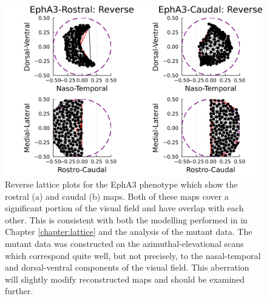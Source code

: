 \begin{figure}[hbt!]
	\centering
	\includegraphics[width=\textwidth]{images/distributed_kernels/figure_lattice_EphA3_post}
	\def\c{Reverse lattice plots for the homozygous EphA3 knock-in phenotype which show the rostral and caudal maps.}
	\caption[\c]{\label{fig:epha3_lattice_post} Reverse lattice plots for the EphA3 phenotype which show the rostral (a) and caudal (b) maps. Both of these maps cover a significant portion of the visual field and have overlap with each other. This is consistent with both the modelling performed in in Chapter \ref{chapter:lattice} and the analysis of the mutant data. The mutant data was constructed on the azimuthal-elevational scans which correspond quite well, but not precisely, to the nasal-temporal and dorsal-ventral components of the visual field. This aberration will slightly modify reconstructed maps and should be examined further.}
\end{figure}
\newpage
